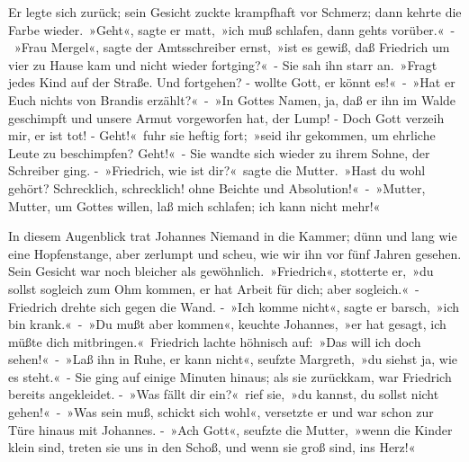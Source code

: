 Er legte sich zurück; sein Gesicht zuckte krampfhaft vor Schmerz; dann kehrte die Farbe wieder. »Geht«, sagte er matt, »ich muß schlafen, dann gehts vorüber.« - »Frau Mergel«, sagte der Amtsschreiber ernst, »ist es gewiß, daß Friedrich um vier zu Hause kam und nicht wieder fortging?« - Sie sah ihn starr an. »Fragt jedes Kind auf der Straße. Und fortgehen? - wollte Gott, er könnt es!« - »Hat er Euch nichts von Brandis erzählt?« - »In Gottes Namen, ja, daß er ihn im Walde geschimpft und unsere Armut vorgeworfen hat, der Lump! - Doch Gott verzeih mir, er ist tot! - Geht!« fuhr sie heftig fort; »seid ihr gekommen, um ehrliche Leute zu beschimpfen? Geht!« - Sie wandte sich wieder zu ihrem Sohne, der Schreiber ging. - »Friedrich, wie ist dir?« sagte die Mutter. »Hast du wohl gehört? Schrecklich, schrecklich! ohne Beichte und Absolution!« - »Mutter, Mutter, um Gottes willen, laß mich schlafen; ich kann nicht mehr!«

In diesem Augenblick trat Johannes Niemand in die Kammer; dünn und lang wie eine Hopfenstange, aber zerlumpt und scheu, wie wir ihn vor fünf Jahren gesehen. Sein Gesicht war noch bleicher als gewöhnlich. »Friedrich«, stotterte er, »du sollst sogleich zum Ohm kommen, er hat Arbeit für dich; aber sogleich.« - Friedrich drehte sich gegen die Wand. - »Ich komme nicht«, sagte er barsch, »ich bin krank.« - »Du mußt aber kommen«, keuchte Johannes, »er hat gesagt, ich müßte dich mitbringen.« Friedrich lachte höhnisch auf: »Das will ich doch sehen!« - »Laß ihn in Ruhe, er kann nicht«, seufzte Margreth, »du siehst ja, wie es steht.« - Sie ging auf einige Minuten hinaus; als sie zurückkam, war Friedrich bereits angekleidet. - »Was fällt dir ein?« rief sie, »du kannst, du sollst nicht gehen!« - »Was sein muß, schickt sich wohl«, versetzte er und war schon zur Türe hinaus mit Johannes. - »Ach Gott«, seufzte die Mutter, »wenn die Kinder klein sind, treten sie uns in den Schoß, und wenn sie groß sind, ins Herz!«

